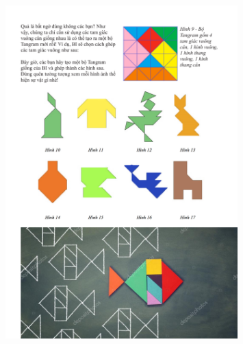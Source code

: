 	\begin{figure}[H]
		\vspace*{-5pt}
		\centering
		\includegraphics[width=0.8\textwidth]{cat-10}
		\vspace*{-5pt}
	\end{figure}


